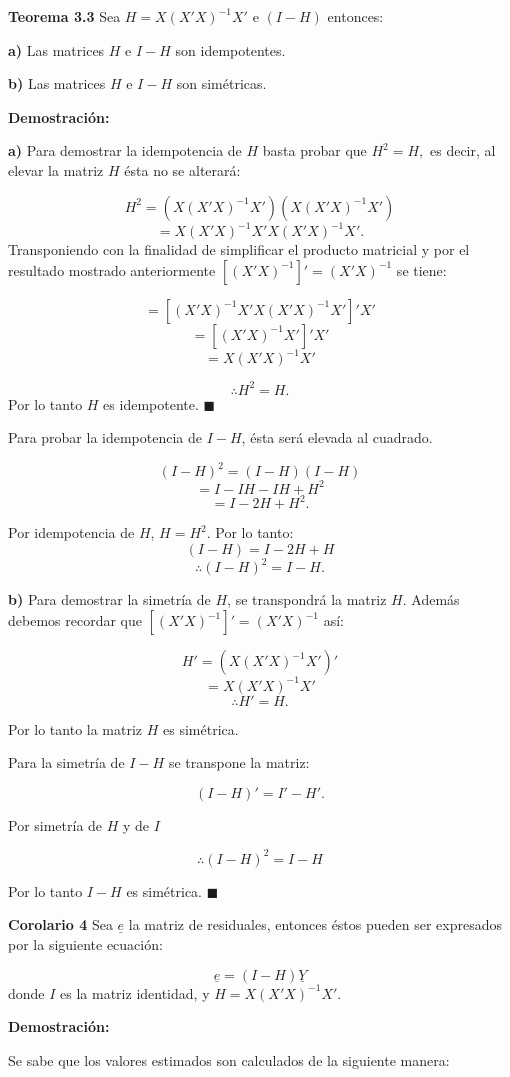 \documentclass[
  a4paper,
  oneside,
  openany]{book}
\begin{document}
\textbf{Teorema 3.3} Sea \(H=X(X'X)^{-1}X'\) e \((I-H)\) entonces:

\textbf{a)} Las matrices \(H\) e \(I-H\) son idempotentes.

\textbf{b)} Las matrices \(H\) e \(I-H\) son simétricas.

\textbf{Demostración:}

\textbf{a)} Para demostrar la idempotencia de \(H\) basta probar que \(H^2=H,\) es decir, al elevar la matriz \(H\) ésta no se alterará:

\[H^2=(X(X'X)^{-1}X')(X(X'X)^{-1}X')\]
\[=X(X'X)^{-1}X'X(X'X)^{-1}X'.\]
Transponiendo con la finalidad de simplificar el producto matricial y por el resultado mostrado anteriormente \([(X'X)^{-1}]'=(X'X)^{-1}\) se tiene:

\[=[(X'X)^{-1}X'X(X'X)^{-1}X']'X'\]
\[=[(X'X)^{-1}X']'X'\]
\[=X(X'X)^{-1}X'\]

\[\therefore H^2=H.\]
Por lo tanto \(H\) es idempotente. \(\blacksquare\)

Para probar la idempotencia de \(I-H\), ésta será elevada al cuadrado.

\[(I-H)^2=(I-H)(I-H)\]
\[=I-IH-IH+H^2\]
\[=I-2H+H^2.\]

Por idempotencia de \(H\), \(H=H^2\). Por lo tanto:
\[(I-H)=I-2H+H\]
\[\therefore (I-H)^2=I-H.\]

\textbf{b)} Para demostrar la simetría de \(H\), se transpondrá la matriz \(H\). Además debemos recordar que \([(X'X)^{-1}]'=(X'X)^{-1}\) así:

\[H'= (X(X'X)^{-1}X')'\]
\[=X(X'X)^{-1}X'\]
\[\therefore H'= H.\]

Por lo tanto la matriz \(H\) es simétrica.

Para la simetría de \(I-H\) se transpone la matriz:

\[(I-H)'=I'-H'.\]

Por simetría de \(H\) y de \(I\)

\[\therefore (I-H)^2=I-H\]

Por lo tanto \(I-H\) es simétrica. \(\blacksquare\)

\textbf{Corolario 4} Sea \(\underline{e}\) la matriz de residuales, entonces éstos pueden ser expresados por la siguiente ecuación:

\[\underline{e}=(I-H)\underline{Y}\]
donde \(I\) es la matriz identidad, y \(H=X(X'X)^{-1}X'.\)

\textbf{Demostración:}

Se sabe que los valores estimados son calculados de la siguiente manera:
\end{document}
